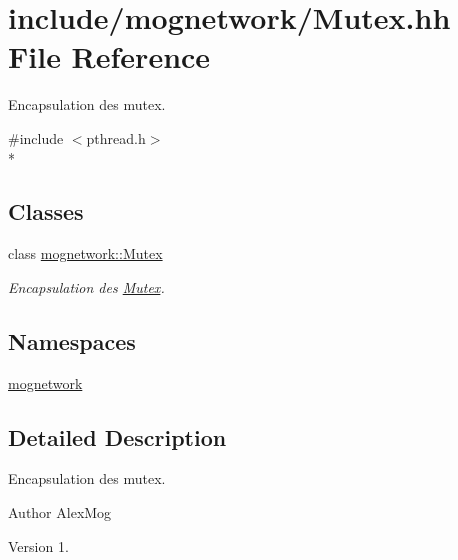 \hypertarget{_mutex_8hh}{\section{include/mognetwork/\-Mutex.hh File Reference}
\label{_mutex_8hh}
}


Encapsulation des mutex.  


{\ttfamily \#include $<$pthread.\-h$>$}\\*
\subsection*{Classes}
\begin{DoxyCompactItemize}
\item 
class \hyperlink{classmognetwork_1_1_mutex}{mognetwork\-::\-Mutex}
\begin{DoxyCompactList}\small\item\em Encapsulation des \hyperlink{classmognetwork_1_1_mutex}{Mutex}. \end{DoxyCompactList}\end{DoxyCompactItemize}
\subsection*{Namespaces}
\begin{DoxyCompactItemize}
\item 
\hyperlink{namespacemognetwork}{mognetwork}
\end{DoxyCompactItemize}


\subsection{Detailed Description}
Encapsulation des mutex. \begin{DoxyAuthor}{Author}
Alex\-Mog 
\end{DoxyAuthor}
\begin{DoxyVersion}{Version}
1. 
\end{DoxyVersion}
